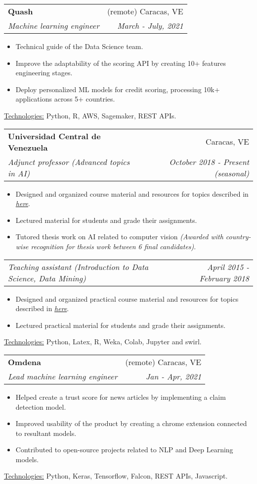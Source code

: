 \documentclass[letterpaper,11pt]{article}
\makeatletter
\newcommand{\sepsection}{\vspace{25pt}}
\newcommand{\resumeItem}[1]{%
  \item\small{
    #1
  }
}
\newcommand{\resumeSubheading}[4]{
  \vspace{8pt}\item%
    \begin{tabular*}{0.97\textwidth}[t]{l@{\extracolsep{\fill}}r}
      \textbf{#1} & #2 \\
      \textit{\small#3} & \textit{\small #4} \\
    \end{tabular*}\vspace{-5pt}
}
\newcommand{\resumeSubSubheading}[2]{
    \vspace{1pt}
    \begin{tabular*}{0.97\textwidth}{l@{\extracolsep{\fill}}r}
      \textit{\small#1} & \textit{\small #2} \\
    \end{tabular*}\vspace{-5pt}
}
\newcommand{\resumeItemListStart}{\begin{itemize}}
\newcommand{\resumeItemListEnd}{\end{itemize}\vspace{-5pt}}
\newcommand{\resumeTech}[2]{
 \underline{#1:} #2
}
\makeatother
\begin{document}
    \newpage
    \sepsection

    \resumeSubheading
      {Quash}{(remote) Caracas, VE}
      {Machine learning engineer}{March - July, 2021}
      \resumeItemListStart
      \resumeItem{Technical guide of the Data Science team.}
      \resumeItem{Improve the adaptability of the scoring API by creating 10+ features engineering stages.}
      \resumeItem{Deploy personalized ML models for credit scoring, processing 10k+ applications across 5+ countries.}
      \resumeItemListEnd
      \resumeTech{Technologies}{Python, R, AWS, Sagemaker, REST APIs.}\\
      
    \sepsection

    \resumeSubheading
      {Universidad Central de Venezuela}{Caracas, VE}
      {Adjunct professor (Advanced topics in AI)}{October 2018 - Present (seasonal)}
      \resumeItemListStart
      \resumeItem{Designed and organized course material and resources for topics described in \href{https://bit.ly/2VYchte}{\textsl{here}}.}
      \resumeItem{Lectured material for students and grade their assignments.}
      \resumeItem{Tutored thesis work on AI related to computer vision \newline \textsl{(Awarded with country-wise recognition for thesis work between 6 final candidates)}.}
      \resumeItemListEnd
    \resumeSubSubheading
      {Teaching assistant (Introduction to Data Science, Data Mining)}{April 2015 - February 2018}
     \resumeItemListStart
      \resumeItem{Designed and organized practical course material and resources for topics described in \href{https://bit.ly/2VYchte}{\textsl{here}}.}
      \resumeItem{Lectured practical material for students and grade their assignments.}
      \resumeItemListEnd
      \resumeTech{Technologies}{Python, Latex, R, Weka, Colab, Jupyter and swirl.}\\

    \resumeSubheading
      {Omdena}{(remote) Caracas, VE}
      {Lead machine learning engineer}{Jan - Apr, 2021}
      \resumeItemListStart
      \resumeItem{Helped create a trust score for news articles by implementing a claim detection model.}
      \resumeItem{Improved usability of the product by creating a chrome extension connected to resultant models.}
      \resumeItem{Contributed to open-source projects related to NLP and Deep Learning models.}
      \resumeItemListEnd
      \resumeTech{Technologies}{Python, Keras, Tensorflow, Falcon, REST APIs, Javascript.}\\
\end{document}
